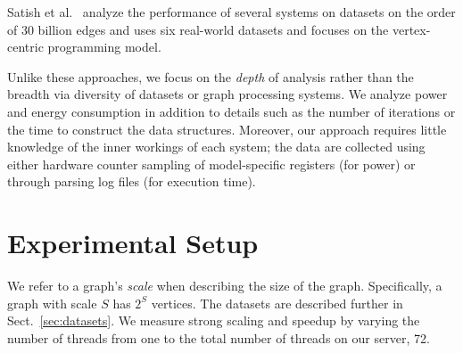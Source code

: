 \documentclass{llncs}
\begin{document}
Satish et al.~\cite{Satish:2014:NavigatingGraph} analyze the performance of several systems on datasets on the order of $30$ billion edges and \cite{Lu:2014:ExperimentalEval} uses six real-world datasets and focuses on the vertex-centric programming model.

Unlike these approaches, we focus on the \emph{depth} of analysis rather than the breadth via diversity of datasets or graph processing systems. We analyze  power and energy consumption in addition to details such as the number of iterations or the time to construct the data structures. Moreover, our approach requires little knowledge of the inner workings of each system; the data are collected using either hardware counter sampling of model-specific registers (for power) or through parsing log files (for execution time).




\section{Experimental Setup}
We refer to a graph's \emph{scale} when describing the size of the graph. Specifically, a graph with scale $S$ has $2^S$ vertices. The datasets are described further in Sect.~\ref{sec:datasets}. We measure strong scaling and speedup by varying the number of threads from one to the total number of threads on our server, 72.
\end{document}
